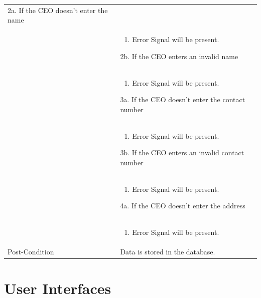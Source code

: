 \documentclass[12pt,a4paper]{article}
\begin{document}
\begin{longtable}{| p{3cm}|p{12cm}|}
2a.  If the CEO doesn't enter the name\\ 	
&	\begin{enumerate}
		\item Error Signal will be present.
	\end{enumerate}
2b. If the CEO enters an invalid name \\ 	
&	\begin{enumerate}
		\item Error Signal will be present.
	\end{enumerate}
3a.  If the CEO doesn't enter the contact number\\ 	
&	\begin{enumerate}
		\item Error Signal will be present.
	\end{enumerate}
3b. If the CEO enters an invalid contact number\\ 	
&	\begin{enumerate}
		\item Error Signal will be present.
	\end{enumerate}
4a.  If the CEO doesn't enter the address\\ 	
&	\begin{enumerate}
		\item Error Signal will be present.
	\end{enumerate}
\\ \hline
Post-Condition &  Data is stored in the database. \\\hline
\end{longtable}

\section {User Interfaces}
\end{document}
